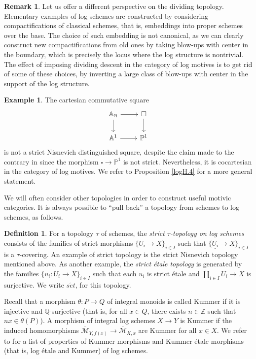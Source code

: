 \documentclass[11pt, a4paper]{amsart}
\theoremstyle{definition}
\newtheorem{df}[thm]{Definition}
\newtheorem{rmk}[thm]{Remark}
\newtheorem{exm}[thm]{Example}
\numberwithin{equation}{subsection}
\newcommand{\N}{\mathbb{N}}
\newcommand{\Z}{\mathbb{Z}}
\renewcommand{\P}{\mathbb{P}}
\newcommand{\A}{\mathbb{A}}
\newcommand{\ol}{\overline}
\renewcommand{\ul}{\underline}
\newcommand{\set}{{s\acute{e}t}}
\newcommand{\cM}{\mathcal{M}}
\newcommand{\boxx}{\square}
\begin{document}
\begin{rmk}
    Let us offer a different perspective on the dividing topology. Elementary examples of log schemes are constructed by considering compactifications of classical schemes, that is, embeddings into proper schemes over the base. The choice of such embedding is not canonical, as we can clearly construct new compactifications from old ones by taking blow-ups with center in the boundary, which is precisely the locus where the log structure is nontrivial. The effect of imposing dividing descent in the category of log motives is to get rid of some of these choices, by inverting a large class of blow-ups with center in the support of the log structure.
\end{rmk}

\begin{exm}
The cartesian commutative square
\[
\begin{tikzcd}
\A_{\N}\ar[d]\ar[r]&
\boxx\ar[d]
\\
\A^1\ar[r]&
\P^1
\end{tikzcd}
\]
is not a strict Nisnevich distinguished square, 
despite the claim made to the contrary in \cite[Example 5.2.11]{logDM} 
since the morphism $\boxx\to \P^1$ is not strict.
Nevertheless, it is cocartesian in the category of log motives.
We refer to Proposition \ref{logH.4} for a more general statement.
\end{exm}

We will often consider other topologies in order to construct useful motivic categories. It is always possible to ``pull back'' a topology from schemes to log schemes, as follows.


\begin{df}
\label{stricttau}
For a topology $\tau$ of schemes,
the \emph{strict $\tau$-topology on log schemes} consists of the families of strict morphisms $\{U_i\to X\}_{i\in I}$ such that $\{\ul{U_i}\to \ul{X}\}_{i\in I}$ is a $\tau$-covering.
An example of strict topology is the strict Nisnevich topology mentioned above. 
As another example, the \emph{strict \'etale topology} is generated by the families $\{u_i\colon U_i\to X\}_{i\in I}$ such that each $u_i$ is strict \'etale and $\amalg_{i\in I}U_i\to X$ is surjective. We write $\set$, for this topology. \index[notation]{set @ $\set$}
\end{df}

Recall that a morphism $\theta\colon P\to Q$ of integral monoids is called Kummer if it is injective and $\mathbb{Q}$-surjective (that is, for all $x\in Q$, there exists $n\in \Z$ such that $nx\in \theta(P)$). A morphism of integral log schemes $X\to Y$ is Kummer if the induced homomorphisms
$\ol{\cM}_{Y,f(x)}\to \ol{\cM}_{X,x}$ are Kummer for all $x\in X$.
We refer to  \cite[\S 2]{MR1922832} for a list of properties of Kummer morphisms and Kummer \'etale morphisms (that is, log \'etale and Kummer) of log schemes. 
\end{document}
